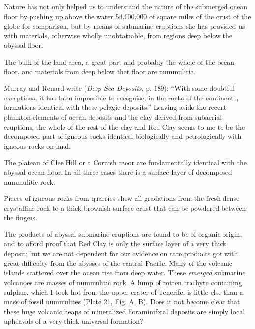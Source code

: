 \documentclass[a4paper, 12pt, oneside, landscape]{article}
\begin{document}
Nature has not only helped us to understand the nature of the submerged ocean floor by pushing up above the water 54,000,000 of square miles of the crust of the globe for comparison, but by means of submarine eruptions she has provided us with materials, otherwise wholly unobtainable, from regions deep below the abyssal floor.

The bulk of the land area, a great part and probably the whole of the ocean floor, and materials from deep below that floor are nummulitic.

Murray and Renard write (\emph{Deep-Sea Deposits}, p. 189): ``With some doubtful exceptions, it has been impossible to recognise, in the rocks of the continents, formations identical with these pelagic deposits.'' Leaving aside the recent plankton elements of ocean deposits and the clay derived from subaerial eruptions, the whole of the rest of the clay and Red Clay seems to me to be the decomposed part of igneous rocks identical biologically and petrologically with igneous rocks on land.

The plateau of Clee Hill or a Cornish moor are fundamentally identical with the abyssal ocean floor. In all three cases there is a surface layer of decomposed nummulitic rock.

Pieces of igneous rocks from quarries show all gradations from the fresh dense crystalline rock to a thick brownish surface crust that can be powdered between the fingers.

The products of abyssal submarine eruptions are found to be of organic origin, and to afford proof that Red Clay is only the surface layer of a very thick deposit; but we are not dependent for our evidence on rare products got with great difficulty from the abysses of the central Pacific. Many of the volcanic islands scattered over the ocean rise from deep water. These \emph{emerged} submarine volcanoes are masses of nummulitic rock. A lump of rotten trachyte containing sulphur, which I took hot from the upper crater of Tenerife, is little else than a mass of fossil nummulites (Plate 21, Fig. A, B). Does it not become clear that these huge volcanic heaps of mineralized Foraminiferal deposits are simply local upheavals of a very thick universal formation?
\end{document}
